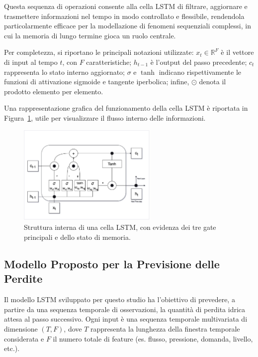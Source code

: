 \documentclass{article}
\begin{document}
Questa sequenza di operazioni consente alla cella LSTM di filtrare, aggiornare e trasmettere informazioni 
nel tempo in modo controllato e flessibile, rendendola particolarmente efficace per la modellazione di 
fenomeni sequenziali complessi, in cui la memoria di lungo termine gioca un ruolo centrale.

Per completezza, si riportano le principali notazioni utilizzate: $x_t \in \mathbb{R}^F$ è il vettore di 
input al tempo $t$, con $F$ caratteristiche; $h_{t-1}$ è l’output del passo precedente; $c_t$ rappresenta 
lo stato interno aggiornato; $\sigma$ e $\tanh$ indicano rispettivamente le funzioni di attivazione 
sigmoide e tangente iperbolica; infine, $\odot$ denota il prodotto elemento per elemento.

Una rappresentazione grafica del funzionamento della cella LSTM è riportata in Figura~\ref{fig:lstm_cell}, 
utile per visualizzare il flusso interno delle informazioni.

\begin{figure}[htbp]
    \centering
    \includegraphics[width=0.6\textwidth]{img/LSTM.png}
    \caption{Struttura interna di una cella LSTM, con evidenza dei tre gate principali e dello stato di memoria.}
    \label{fig:lstm_cell}
\end{figure}

\subsection{Modello Proposto per la Previsione delle Perdite}

Il modello LSTM sviluppato per questo studio ha l'obiettivo di prevedere, a partire da una sequenza 
temporale di osservazioni, la quantità di perdita idrica attesa al passo successivo. Ogni input è una 
sequenza temporale multivariata di dimensione $(T, F)$, dove $T$ rappresenta la lunghezza della finestra 
temporale considerata e $F$ il numero totale di feature (es. flusso, pressione, domanda, livello, etc.).
\end{document}
